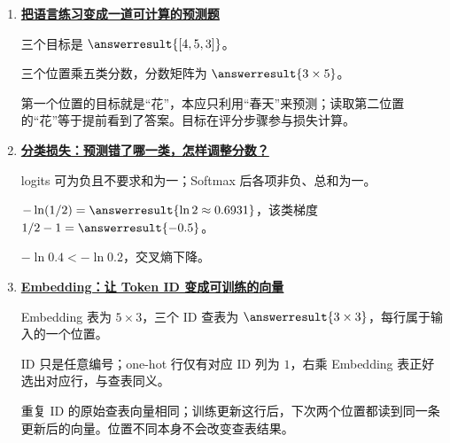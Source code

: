 \begin{enumerate}[leftmargin=5.4em,labelsep=.7em,itemsep=9pt]
\par{}
\item[\textbf{第~\ref*{intro:20b-task-contract}~章}] \label{answer:20b-task-contract}\textbf{\hyperref[check:20b-task-contract]{把语言练习变成一道可计算的预测题}}\par\nobreak
{}三个目标是 $\answerresult{[4,5,3]}$。
\par{}三个位置乘五类分数，分数矩阵为 $\answerresult{3\times5}$。
\par{}第一个位置的目标就是“花”，本应只利用“春天”来预测；读取第二位置的“花”等于提前看到了答案。目标在评分步骤参与损失计算。
\par{}
\item[\textbf{第~\ref*{intro:20c-classification-loss}~章}] \label{answer:20c-classification-loss}\textbf{\hyperref[check:20c-classification-loss]{分类损失：预测错了哪一类，怎样调整分数？}}\par\nobreak
{}logits 可为负且不要求和为一；Softmax 后各项非负、总和为一。
\par{}$-\ln(1/2)=\answerresult{\ln2\approx0.6931}$，该类梯度 $1/2-1=\answerresult{-0.5}$。
\par{}$-\ln0.4<-\ln0.2$，交叉熵下降。
\par{}
\item[\textbf{第~\ref*{intro:20-embeddings}~章}] \label{answer:20-embeddings}\textbf{\hyperref[check:20-embeddings]{Embedding：让 Token ID 变成可训练的向量}}\par\nobreak
{}Embedding 表为 $5\times3$，三个 ID 查表为 $\answerresult{3\times3}$，每行属于输入的一个位置。
\par{}ID 只是任意编号；one-hot 行仅有对应 ID 列为 $1$，右乘 Embedding 表正好选出对应行，与查表同义。
\par{}重复 ID 的原始查表向量相同；训练更新这行后，下次两个位置都读到同一条更新后的向量。位置不同本身不会改变查表结果。

\end{enumerate}
